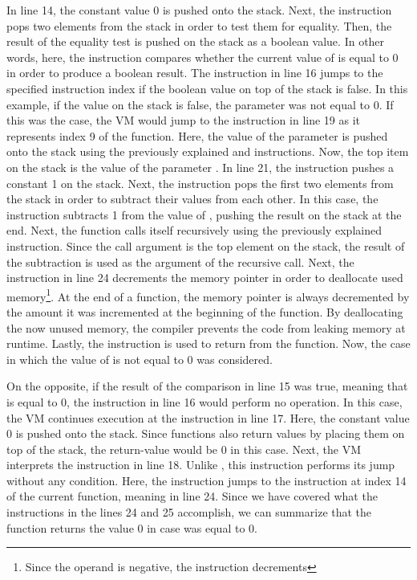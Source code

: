 In line 14, the constant value 0 is pushed onto the stack.
Next, the  instruction pops two elements from the stack in order to test them for equality.
Then, the result of the equality test is pushed on the stack as a boolean value.
In other words, here, the instruction compares whether the current value of  is equal to 0 in order to produce a boolean result.
The  instruction in line 16 jumps to the specified instruction index if the boolean value on top of the stack is false.
In this example, if the value on the stack is false, the parameter  was not equal to 0.
If this was the case, the VM would jump to the instruction in line 19 as it represents index 9 of the  function.
Here, the value of the parameter  is pushed onto the stack using the previously explained  and  instructions.
Now, the top item on the stack is the value of the parameter .
In line 21, the  instruction pushes a constant 1 on the stack.
Next, the  instruction pops the first two elements from the stack in order to subtract their values from each other.
In this case, the instruction subtracts 1 from the value of , pushing the result on the stack at the end.
Next, the  function calls itself recursively using the previously explained  instruction.
Since the call argument is the top element on the stack, the result of the subtraction is used as the argument of the recursive call.
Next, the  instruction in line 24 decrements the memory pointer in order to deallocate used memory\footnote{Since the operand is negative, the instruction decrements }.
At the end of a function, the memory pointer is always decremented by the amount it was incremented at the beginning of the function.
By deallocating the now unused memory, the compiler prevents the code from leaking memory at runtime.
Lastly, the  instruction is used to return from the  function.
Now, the case in which the value of  is not equal to 0 was considered.

On the opposite, if the result of the comparison in line 15 was true, meaning that  is equal to 0, the  instruction in line 16 would perform no operation.
In this case, the VM continues execution at the  instruction in line 17.
Here, the constant value 0 is pushed onto the stack.
Since functions also return values by placing them on top of the stack, the return-value would be 0 in this case.
Next, the VM interprets the  instruction in line 18.
Unlike , this instruction performs its jump without any condition.
Here, the instruction jumps to the instruction at index 14 of the current function, meaning  in line 24.
Since we have covered what the instructions in the lines 24 and 25 accomplish, we can summarize that the function returns the value 0 in case  was equal to 0.

